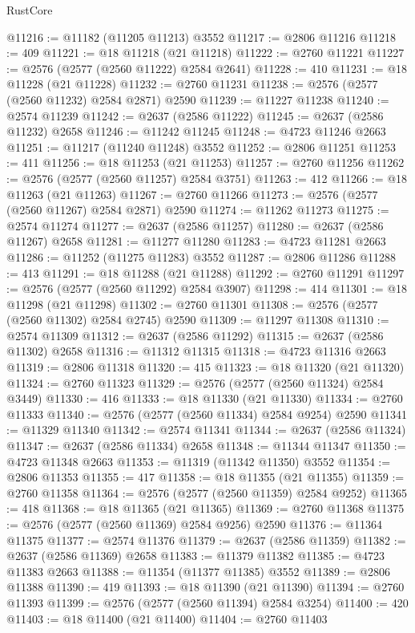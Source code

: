 \begin{lexlean}{RustCore}
\begin{coremodule}
@11216 := @11182 (@11205 @11213) @3552
@11217 := @2806 @11216
@11218 := 409
@11221 := @18 @11218 (@21 @11218)
@11222 := @2760 @11221
@11227 := @2576 (@2577 (@2560 @11222) @2584 @2641)
@11228 := 410
@11231 := @18 @11228 (@21 @11228)
@11232 := @2760 @11231
@11238 := @2576 (@2577 (@2560 @11232) @2584 @2871) @2590
@11239 := @11227 @11238
@11240 := @2574 @11239
@11242 := @2637 (@2586 @11222)
@11245 := @2637 (@2586 @11232) @2658
@11246 := @11242 @11245
@11248 := @4723 @11246 @2663
@11251 := @11217 (@11240 @11248) @3552
@11252 := @2806 @11251
@11253 := 411
@11256 := @18 @11253 (@21 @11253)
@11257 := @2760 @11256
@11262 := @2576 (@2577 (@2560 @11257) @2584 @3751)
@11263 := 412
@11266 := @18 @11263 (@21 @11263)
@11267 := @2760 @11266
@11273 := @2576 (@2577 (@2560 @11267) @2584 @2871) @2590
@11274 := @11262 @11273
@11275 := @2574 @11274
@11277 := @2637 (@2586 @11257)
@11280 := @2637 (@2586 @11267) @2658
@11281 := @11277 @11280
@11283 := @4723 @11281 @2663
@11286 := @11252 (@11275 @11283) @3552
@11287 := @2806 @11286
@11288 := 413
@11291 := @18 @11288 (@21 @11288)
@11292 := @2760 @11291
@11297 := @2576 (@2577 (@2560 @11292) @2584 @3907)
@11298 := 414
@11301 := @18 @11298 (@21 @11298)
@11302 := @2760 @11301
@11308 := @2576 (@2577 (@2560 @11302) @2584 @2745) @2590
@11309 := @11297 @11308
@11310 := @2574 @11309
@11312 := @2637 (@2586 @11292)
@11315 := @2637 (@2586 @11302) @2658
@11316 := @11312 @11315
@11318 := @4723 @11316 @2663
@11319 := @2806 @11318
@11320 := 415
@11323 := @18 @11320 (@21 @11320)
@11324 := @2760 @11323
@11329 := @2576 (@2577 (@2560 @11324) @2584 @3449)
@11330 := 416
@11333 := @18 @11330 (@21 @11330)
@11334 := @2760 @11333
@11340 := @2576 (@2577 (@2560 @11334) @2584 @9254) @2590
@11341 := @11329 @11340
@11342 := @2574 @11341
@11344 := @2637 (@2586 @11324)
@11347 := @2637 (@2586 @11334) @2658
@11348 := @11344 @11347
@11350 := @4723 @11348 @2663
@11353 := @11319 (@11342 @11350) @3552
@11354 := @2806 @11353
@11355 := 417
@11358 := @18 @11355 (@21 @11355)
@11359 := @2760 @11358
@11364 := @2576 (@2577 (@2560 @11359) @2584 @9252)
@11365 := 418
@11368 := @18 @11365 (@21 @11365)
@11369 := @2760 @11368
@11375 := @2576 (@2577 (@2560 @11369) @2584 @9256) @2590
@11376 := @11364 @11375
@11377 := @2574 @11376
@11379 := @2637 (@2586 @11359)
@11382 := @2637 (@2586 @11369) @2658
@11383 := @11379 @11382
@11385 := @4723 @11383 @2663
@11388 := @11354 (@11377 @11385) @3552
@11389 := @2806 @11388
@11390 := 419
@11393 := @18 @11390 (@21 @11390)
@11394 := @2760 @11393
@11399 := @2576 (@2577 (@2560 @11394) @2584 @3254)
@11400 := 420
@11403 := @18 @11400 (@21 @11400)
@11404 := @2760 @11403

\end{coremodule}
\end{lexlean}
